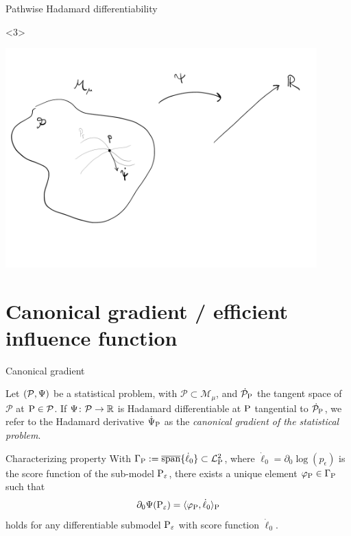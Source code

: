 \documentclass{beamer}\usepackage{listings}
\begin{document}
\begin{frame}[label={sec:orgd72ec36}]{Pathwise Hadamard differentiability}
\begin{onlyenv}<3>
\begin{center}
\includegraphics[width=0.9\textwidth]{./figures/Pathwise-derivative2.pdf}
\end{center}
\end{onlyenv}
\end{frame}



\section{Canonical gradient / efficient influence function}
\label{sec:org4977c04}
\begin{frame}[label={sec:org34657be}]{Canonical gradient}
\begin{definition}
Let \((\mathcal{P}, \TT)\) be a statistical problem, with \(\mathcal{P} \subset \mathcal{M}_{\mu}\),
and \(\dot{\mathcal{P}}_{\P}\) the tangent space of \(\mathcal{P}\) at \(\P \in \mathcal{P}\). If
\(\TT \colon \mathcal{P} \rightarrow \R\) is Hadamard differentiable at \(\P\) tangential to
\(\dot{\mathcal{P}}_{\P}\), we refer to the Hadamard derivative \(\dot{\TT}_{\P}\) as the
\textit{canonical gradient of the statistical problem}.

\pause
\end{definition}

\begin{block}{Characterizing property}
With $\Gamma_{\P} := \overline{\mathrm{span}}\{\dot{\ell}_0\} \subset \lp$, where
$\dot{\ell}_0 = \partial_0{\log(p_{\epsilon})}$ is the score function of the sub-model
$\P_{\epsilon}$, there exists a unique element $\phi_{\P} \in \Gamma_{\P}$ such that
\begin{equation*}
  \partial_0{\TT(\P_{\epsilon})}
  = \langle \phi_{\P}, \dot{\ell}_0 \rangle_{\P}
\end{equation*}
holds for any differentiable submodel $\P_{\epsilon}$ with score function $\dot{\ell}_0$.
\end{block}
\end{frame}
\end{document}
